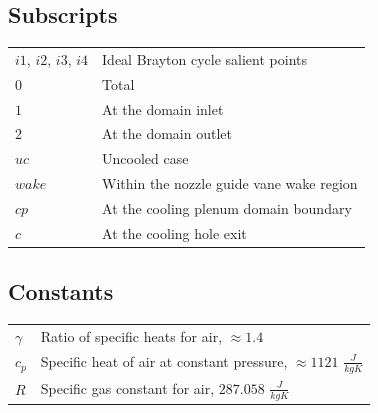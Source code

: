 \documentclass[a4paper, 11pt, oneside]{report}
\begin{document}
\subsection*{Subscripts}
\begin{table}[H]
\begin{center}
\begin{tabular}{ll}
$i1$, $i2$, $i3$, $i4$ & Ideal Brayton cycle salient points \\
$0$ & Total \\
$1$ & At the domain inlet \\
$2$ & At the domain outlet \\
$uc$ & Uncooled case \\
$wake$ & Within the nozzle guide vane wake region \\
$cp$ & At the cooling plenum domain boundary \\
$c$ & At the cooling hole exit
\end{tabular}
\end{center}
\end{table}

\subsection*{Constants}
\begin{table}[H]
\begin{center}
\begin{tabular}{ll}
$\gamma$ & Ratio of specific heats for air, $\approx 1.4$ \\
$c_p$ & Specific heat of air at constant pressure, $\approx 1121$ $\frac{J}{kg K}$ \\
$R$ & Specific gas constant for air, $287.058$ $\frac{J}{kg K}$
\end{tabular}
\end{center}
\end{table}
\end{document}
